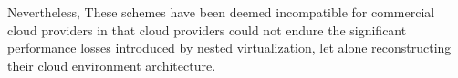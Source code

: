 Nevertheless, These schemes have been deemed incompatible for commercial cloud providers in that cloud providers could not endure the significant performance losses introduced by nested virtualization, let alone reconstructing their cloud environment architecture.


\iffalse
################################
###### 关于以往方案的描述 ######
################################
但是这些功能往往提供的是一个相对封闭的运行环境，其与外界的交互是十分受限的。
对在被这些硬件包括的区域中的代码和数据的访问是十分受限的，
并不能满足将整个虚拟化环境相关特权分离的环境要求。此外，这些硬件特性需要研发者重新设计他们的软件架构甚至是逻辑。

################################
###### 关于以往方案的描述 ######
################################

\fi

